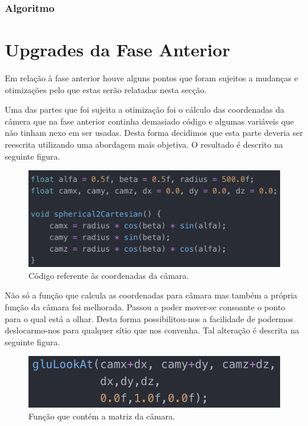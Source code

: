 \documentclass[a4paper]{article}
\begin{document}
 \subsubsection{Algoritmo}




\newpage

\section{Upgrades da Fase Anterior}

Em relação à fase anterior houve alguns pontos que foram sujeitos a mudanças e otimizações pelo que estas serão relatadas nesta secção.

Uma das partes que foi sujeita a otimização foi o cálculo das coordenadas da câmera que na fase anterior continha demasiado código e algumas variáveis que não tinham nexo em ser usadas.
Desta forma decidimos que esta parte deveria ser reescrita utilizando uma abordagem mais objetiva. O resultado é descrito na seguinte figura.

\begin{figure}[H]
\centering
\includegraphics[scale=0.9]{camara.png}
\caption{Código referente às coordenadas da câmara.}
\label{img:camara}
\end{figure}

Não só a função que calcula as coordenadas para câmara mas também a própria função da câmara foi melhorada. Passou a poder mover-se consoante o ponto para o qual está a olhar. Desta forma possibilitou-nos a facilidade de podermos deslocarmo-nos para qualquer sítio que nos convenha. Tal alteração é descrita na seguinte figura.

\begin{figure}[H]
\centering
\includegraphics[scale=0.9]{mat_camara.png}
\caption{Função que contém a matriz da câmara.}
\label{img:mat_camara}
\end{figure}
\end{document}
